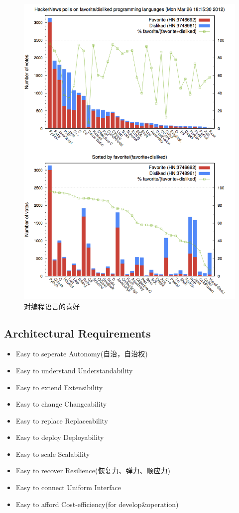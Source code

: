 \documentclass{book}
\begin{document}
\begin{figure}[htbp]
	\centering
	\includegraphics[scale=1]{YourFavoriteDislikeProgramLanguage.png}
	\caption{对编程语言的喜好}
	\label{fig:YourFavoriteDislikeProgramLanguage}
\end{figure}

\subsection{Architectural Requirements}

\begin{itemize}
\item{Easy to seperate \textrightarrow Autonomy(自治，自治权)}
\item{Easy to understand \textrightarrow Understandability}
\item{Easy to extend \textrightarrow Extensibility}
\item{Easy to change \textrightarrow Changeability}
\item{Easy to replace \textrightarrow Replaceability}
\item{Easy to deploy \textrightarrow Deployability}
\item{Easy to scale \textrightarrow Scalability}
\item{Easy to recover \textrightarrow Resilience(恢复力、弹力、顺应力)}
\item{Easy to connect \textrightarrow Uniform Interface}
\item{Easy to afford \textrightarrow Cost-efficiency(for develop\&operation)}
\end{itemize}
\end{document}
